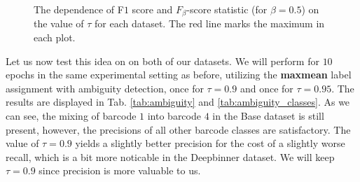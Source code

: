\begin{figure}[!ht]
    \qquad
    \caption[Scoring scheme construction.]{The dependence of F$1$ score and $F_{\beta}$-score statistic (for $\beta = 0.5$) on the value of $\tau$ for each dataset. The red line marks the maximum in each plot.}%
    \label{fig:f1_scores}%
\end{figure}

Let us now test this idea on on both of our datasets. We will perform for $10$ epochs in the same experimental setting as before, utilizing the \textbf{maxmean} label assignment with ambiguity detection, once for $\tau = 0.9$ and once for $\tau = 0.95$. The results are displayed in Tab. \ref{tab:ambiguity} and \ref{tab:ambiguity_classes}. As we can see, the mixing of barcode $1$ into barcode $4$ in the Base dataset is still present, however, the precisions of all other barcode classes are satisfactory. The value of $\tau = 0.9$ yields a slightly better precision for the cost of a slightly worse recall, which is a bit more noticable in the Deepbinner dataset. We will keep $\tau = 0.9$ since precision is more valuable to us.


